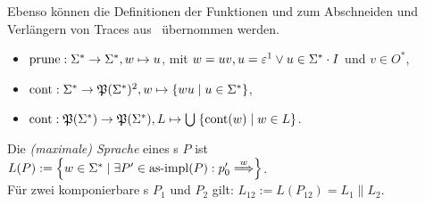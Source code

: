 Ebenso können die Definitionen der Funktionen \prune{} und \cont{} zum
Abschneiden und Verlängern von Traces aus~\cite{Schinko2016BA} übernommen
werden.

\begin{Def}\mbox{}
  \begin{itemize}
    \item $\mathrm{prune}{}:\Sigma ^*\rightarrow\Sigma ^*, w\mapsto u$, mit $w=uv,
      u=\varepsilon\footnotemark\vee u\in\Sigma ^*\cdot I$ und $v\in O^*$,
    \item $\cont{}:\Sigma ^*\rightarrow\mathfrak{P}(\Sigma ^*)\footnotemark,
      w\mapsto\left\{wu\mid u\in\Sigma ^*\right\}$,
    \item $\mathrm{cont}{}:\mathfrak{P}(\Sigma ^*)\rightarrow\mathfrak{P}(\Sigma ^*),
      L\mapsto\bigcup\hspace{1pt}\left\{\mathrm{cont}{}(w)\mid w\in L\right\}$.
  \end{itemize}
\end{Def}

\begin{Def}[Sprache]
  \label{LDef}
  Die \emph{(maximale) Sprache} eines \MEIO{}s $P$ ist $L(P) := \left\{w\in
  \Sigma ^* \mid \exists P'\in\asimp (P) : p'_0\weakmust[w]
  \right\}$.\\
  Für zwei komponierbare \MEIO{}s $P_1$ und $P_2$ gilt: $L_{12} := L(P_{12}) =
  L_1\|L_2$.
\end{Def}
